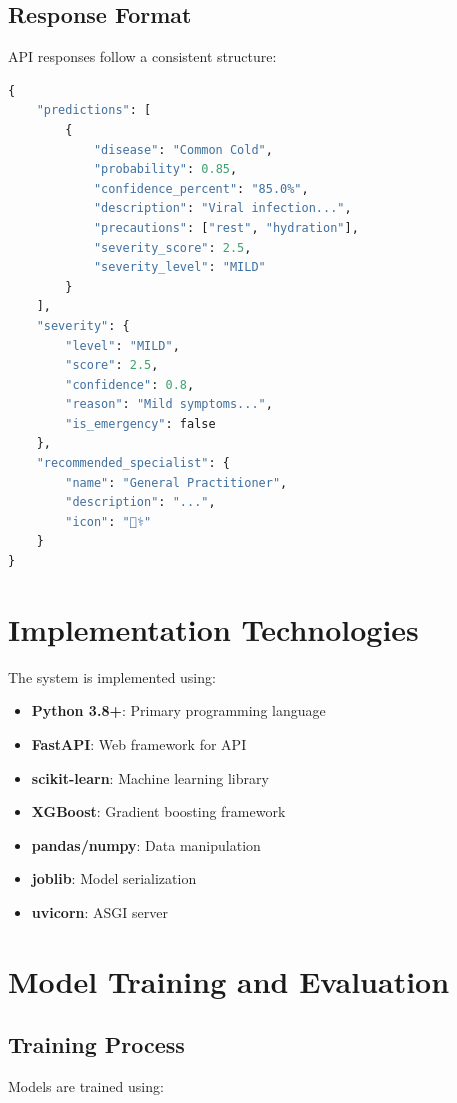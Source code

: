 \subsection{Response Format}
API responses follow a consistent structure:

\begin{lstlisting}[language=Python, caption=Example API Response]
{
    "predictions": [
        {
            "disease": "Common Cold",
            "probability": 0.85,
            "confidence_percent": "85.0%",
            "description": "Viral infection...",
            "precautions": ["rest", "hydration"],
            "severity_score": 2.5,
            "severity_level": "MILD"
        }
    ],
    "severity": {
        "level": "MILD",
        "score": 2.5,
        "confidence": 0.8,
        "reason": "Mild symptoms...",
        "is_emergency": false
    },
    "recommended_specialist": {
        "name": "General Practitioner",
        "description": "...",
        "icon": "👨‍⚕️"
    }
}
\end{lstlisting}

\section{Implementation Technologies}
The system is implemented using:

\begin{itemize}
    \item \textbf{Python 3.8+}: Primary programming language
    \item \textbf{FastAPI}: Web framework for API
    \item \textbf{scikit-learn}: Machine learning library
    \item \textbf{XGBoost}: Gradient boosting framework
    \item \textbf{pandas/numpy}: Data manipulation
    \item \textbf{joblib}: Model serialization
    \item \textbf{uvicorn}: ASGI server
\end{itemize}

\section{Model Training and Evaluation}
\subsection{Training Process}
Models are trained using:

